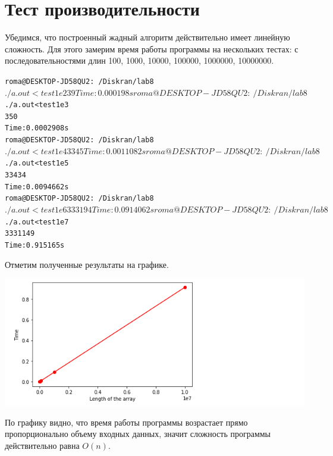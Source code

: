 \section{Тест производительности}

Убедимся, что построенный жадный алгоритм действительно имеет линейную сложность. Для этого замерим время работы программы на нескольких тестах: с последовательностями длин 100, 1000, 10000, 100000, 1000000, 10000000.

\begin{alltt}
roma@DESKTOP-JD58QU2:~/Diskran/lab8$ ./a.out < test1e2
39
Time: 0.000198 s
roma@DESKTOP-JD58QU2:~/Diskran/lab8$ ./a.out < test1e3
350
Time: 0.0002908 s
roma@DESKTOP-JD58QU2:~/Diskran/lab8$ ./a.out < test1e4
3345
Time: 0.0011082 s
roma@DESKTOP-JD58QU2:~/Diskran/lab8$ ./a.out < test1e5
33434
Time: 0.0094662 s
roma@DESKTOP-JD58QU2:~/Diskran/lab8$ ./a.out < test1e6
333194
Time: 0.0914062 s
roma@DESKTOP-JD58QU2:~/Diskran/lab8$ ./a.out < test1e7
3331149
Time: 0.915165 s
\end{alltt}

Отметим полученные результаты на графике.

\begin{center}
	\includegraphics{src/123.png}
\end{center}

По графику видно, что время работы программы возрастает прямо пропорционально объему входных данных, значит сложность программы действительно равна $O(n)$.

\pagebreak

